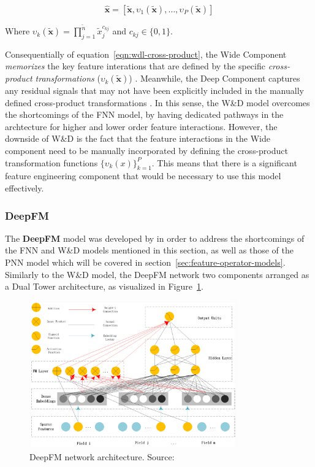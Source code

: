 \documentclass{mldsmsc}
\begin{document}
\begin{equation}
\label{eqn:wdl-cross-product}
\hat{\mathbf{x}} = [\tilde{\mathbf{x}}, \upsilon_1({\tilde{\mathbf{x}}}),\ldots , \upsilon_P({\tilde{\mathbf{x}}})]
\end{equation}

Where $\upsilon_k({\tilde{\mathbf{x}}}) = \prod_{j=1}^{\tilde{n}}\tilde{x}_j^{c_{kj}}$
and $c_{kj} \in \{ 0, 1 \}$.

Consequentially of equation~\ref{eqn:wdl-cross-product}, the Wide Component \emph{memorizes}
the key feature interations that are defined by the specific \emph{cross-product transformations}
($\upsilon_{k}(\tilde{\mathbf{x}})$) \citep{RefWorks:cheng2016wide}. Meanwhile, the Deep Component captures any residual
signals that may not have been explicitly included in the manually defined cross-product transformations
\citep{RefWorks:zhang2021deep}. In this sense, the W\&D model overcomes the
shortcomings of the FNN model, by having dedicated pathways in the archtecture
for higher and lower order feature interactions. However, the downside
of W\&D is the fact that the feature interactions in the Wide component
need to be manually incorporated by defining the cross-product transformation
functions $\{\upsilon_k(x)\}_{k=1}^{P}$. This means that there is a significant
feature engineering component that would be necessary to use this model effectively. 

\subsubsection{DeepFM}

The \textbf{DeepFM} model was developed by \cite{RefWorks:guo2017deepfm:} in order
to address the shortcomings of the FNN and W\&D models mentioned in this section, as 
well as those of the PNN model which will be covered in section~\ref{sec:feature-operator-models}.
Similarly to the W\&D model, the DeepFM network two components arranged as a Dual Tower
architecture, as visualized in Figure~\ref{fig:deepfm}.

\begin{figure}[h]
    \centering
    \includegraphics[width=0.8\textwidth]{../figures/dfm.png}
    \caption{DeepFM network architecture. Source: \citep{RefWorks:shen2017deepctr:}}
    \label{fig:deepfm}
\end{figure}
\end{document}
